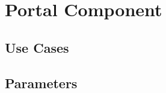 
\section{Portal Component} \label{s:component-portal}
\subsection{Use Cases}
\subsection{Parameters}
